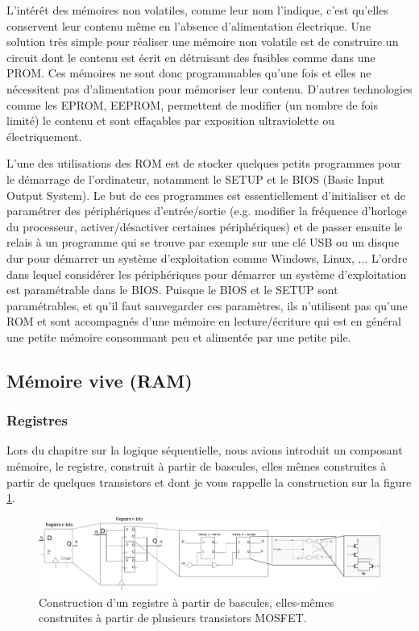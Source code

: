 L'intérêt des mémoires non volatiles, comme leur nom l'indique, c'est qu'elles conservent leur contenu même en l'absence d'alimentation électrique. Une solution très simple pour réaliser une mémoire non volatile est de construire un circuit dont le contenu est écrit en détruisant des fusibles comme dans une PROM. Ces mémoires ne sont donc programmables qu'une fois et elles ne nécessitent pas d'alimentation pour mémoriser leur contenu. D'autres technologies comme les EPROM, EEPROM, permettent de modifier (un nombre de fois limité) le contenu et sont effaçables par exposition ultraviolette ou électriquement.

L'une des utilisations des ROM est de stocker quelques petits programmes pour le démarrage de l'ordinateur, notamment le SETUP et le BIOS (Basic Input Output System). Le but de ces programmes est essentiellement d'initialiser et de paramétrer des périphériques d'entrée/sortie (e.g. modifier la fréquence d'horloge du processeur, activer/désactiver certaines périphériques) et de passer ensuite le relais à un programme qui se trouve par exemple sur une clé USB ou un disque dur pour démarrer un système d'exploitation comme Windows, Linux, ... L'ordre dans lequel considérer les périphériques pour démarrer un système d'exploitation est paramétrable dans le BIOS. Puisque le BIOS et le SETUP sont paramétrables, et qu'il faut sauvegarder ces paramètres, ils n'utilisent pas qu'une ROM et sont accompagnés d'une mémoire en lecture/écriture qui est en général une petite mémoire consommant peu et alimentée par une petite pile.



\subsection{Mémoire vive (RAM)}
\subsubsection{Registres}

Lors du chapitre sur la logique séquentielle, nous avions introduit un composant mémoire, le registre, construit à partir de bascules, elles mêmes construites à partir de quelques transistors et dont je vous rappelle la construction sur la figure \ref{fig:mem_register}.

\begin{figure}[htbp]
\includegraphics[width=\linewidth]{Figs/memory_register.pdf}
\caption{\label{fig:mem_register} Construction d'un registre à partir de bascules, elles-mêmes construites à partir de plusieurs transistors MOSFET.}
\end{figure}

